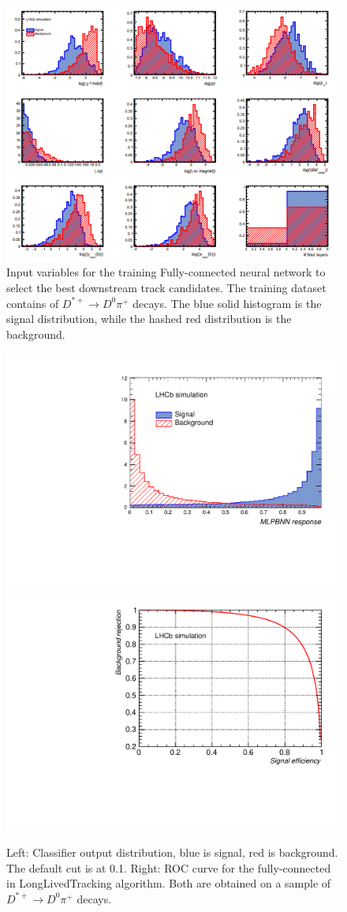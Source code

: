 \begin{figure}[!htbp]
\begin{center}
\includegraphics[width=0.99\linewidth]{figures/NN/input_mva.PNG}
\caption{Input variables for the training Fully-connected neural network to select the best downstream track candidates. The training dataset contains of
 $D^{*+} \rightarrow D^{0}\pi^{+}$ decays. The blue solid histogram is the signal
distribution, while the hashed red distribution is the background.}
\label{fig:MVAVars}
\end{center}
\end{figure}

\begin{figure}[!htbp]
\begin{center}
\includegraphics[rotate=270, width=0.45\linewidth]{figures/NN/ClassifierOutputDistribution.pdf}
\includegraphics[rotate=270, width=0.45\linewidth]{figures/NN/ROC.pdf}
\caption{Left: Classifier output distribution, blue is signal, red is
background. The default cut is at 0.1. Right: ROC curve for the fully-connected in LongLivedTracking algorithm. Both are obtained on a sample of
 $D^{*+} \rightarrow D^{0}\pi^{+}$  decays.}
\label{fig:ROC}
\end{center}
\end{figure}

